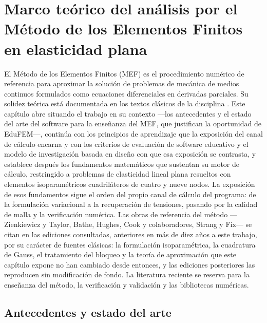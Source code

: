 \chapter{Marco teórico del análisis por el Método de los Elementos Finitos en elasticidad plana}
\label{cap:marco_teorico}

El Método de los Elementos Finitos (MEF) es el procedimiento numérico de referencia para aproximar la solución de problemas de mecánica de medios continuos formulados como ecuaciones diferenciales en derivadas parciales. Su solidez teórica está documentada en los textos clásicos de la disciplina \autocite{zienkiewicz2013fem,bathe2014fem,cook2002concepts}. Este capítulo abre situando el trabajo en su contexto —los antecedentes y el estado del arte del software para la enseñanza del MEF, que justifican la oportunidad de EduFEM—, continúa con los principios de aprendizaje que la exposición del canal de cálculo encarna y con los criterios de evaluación de software educativo y el modelo de investigación basada en diseño con que esa exposición se contrasta, y establece después los fundamentos matemáticos que sustentan su motor de cálculo, restringido a problemas de elasticidad lineal plana resueltos con elementos isoparamétricos cuadriláteros de cuatro y nueve nodos. La exposición de esos fundamentos sigue el orden del propio canal de cálculo del programa: de la formulación variacional a la recuperación de tensiones, pasando por la calidad de malla y la verificación numérica. Las obras de referencia del método —Zienkiewicz y Taylor, Bathe, Hughes, Cook y colaboradores, Strang y Fix— se citan en las ediciones consultadas, anteriores en más de diez años a este trabajo, por su carácter de fuentes clásicas: la formulación isoparamétrica, la cuadratura de Gauss, el tratamiento del bloqueo y la teoría de aproximación que este capítulo expone no han cambiado desde entonces, y las ediciones posteriores las reproducen sin modificación de fondo. La literatura reciente se reserva para la enseñanza del método, la verificación y validación y las bibliotecas numéricas.

\section{Antecedentes y estado del arte}
\label{sec:antecedentes}

